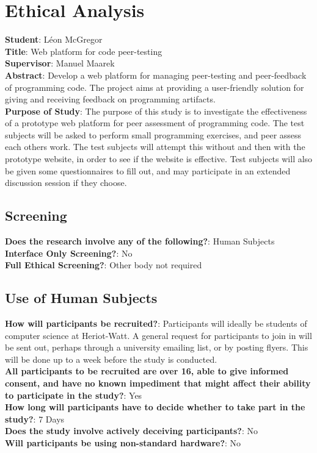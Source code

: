 \documentclass[a4paper,11pt]{report}
\begin{document}
\singlespacing
\printbibliography

\begin{landscape}

\end{landscape}

\section*{Ethical Analysis}
\textbf{Student}: L\'eon McGregor\\
\textbf{Title}: Web platform for code peer-testing\\
\textbf{Supervisor}: Manuel Maarek\\
\textbf{Abstract}: Develop a web platform for managing peer-testing and peer-feedback of programming code. The project aims at providing a user-friendly solution for giving and receiving feedback on programming artifacts.\\
\textbf{Purpose of Study}: The purpose of this study is to investigate the effectiveness of a prototype web platform for peer assessment of programming code. The test subjects will be asked to perform small programming exercises, and peer assess each others work. The test subjects will attempt this without and then with the prototype website, in order to see if the website is effective. Test subjects will also be given some questionnaires to fill out, and may participate in an extended discussion session if they choose.

\subsection*{Screening}
\textbf{Does the research involve any of the following?}: Human Subjects\\
\textbf{Interface Only Screening?}: No\\
\textbf{Full Ethical Screening?}: Other body not required

\subsection*{Use of Human Subjects}
\textbf{How will participants be recruited?}: Participants will ideally be students of computer science at Heriot-Watt. A general request for participants to join in will be sent out, perhaps through a university emailing list, or by posting flyers. This will be done up to a week before the study is conducted.\\
\textbf{All participants to be recruited are over 16, able to give informed consent, and have no known impediment that might affect their ability to participate in the study?}: Yes\\
\textbf{How long will participants have to decide whether to take part in the study?}: 7 Days\\
\textbf{Does the study involve actively deceiving participants?}: No\\
\textbf{Will participants be using non-standard hardware?}: No
\end{document}
